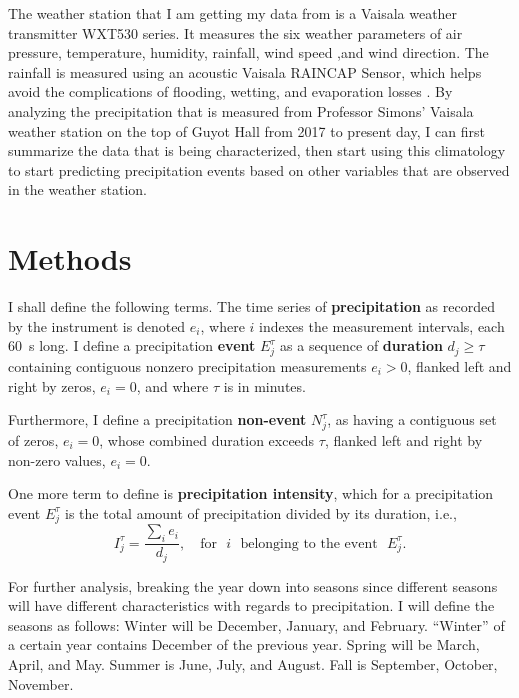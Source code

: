 \documentclass[11pt]{report}
\newcommand{\fracd}[2]{\frac{\displaystyle{#1}}{\displaystyle{#2}}}
\begin{document}
% 

 The weather station that I am getting my data from is a Vaisala weather transmitter WXT530 series. It measures the six weather parameters of air pressure, temperature, humidity, rainfall, wind speed ,and wind direction. The rainfall is measured using an acoustic Vaisala RAINCAP Sensor, which helps avoid the complications of flooding, wetting, and evaporation losses \cite{Vaisala}. By analyzing the precipitation that is measured from Professor Simons' Vaisala weather station on the top of Guyot Hall from 2017 to present day, I can first summarize the data that is being characterized, then start using this climatology to start predicting precipitation events based on other variables that are observed in the weather station. 
\section{Methods \label{sec:methods}}

I shall define the following terms. The time series of
\textbf{precipitation} as recorded by the instrument is denoted $e_i$,
where $i$ indexes the measurement intervals, each 60~s long. I define
a precipitation \textbf{event} $E_j^\tau $ as a sequence of
\textbf{duration} $d_j\ge \tau$ containing contiguous nonzero
precipitation measurements $e_i>0$, flanked left and right by zeros,
$e_i=0$, and where $\tau$ is in minutes.

Furthermore, I define a precipitation \textbf{non-event} $N_j^\tau$,
  as having a contiguous set of zeros, $e_i=0$, whose combined duration
  exceeds $\tau$, flanked left and right by non-zero values, $e_i=0$.

One more term to define is \textbf{precipitation intensity}, which for
a precipitation event $E_j^\tau$ is the total amount of precipitation
divided by its duration, i.e., 
\begin{equation}
I_j^\tau = \fracd{\sum_i e_i }{d_j} ,
\quad
\mbox{for}\,\,\,\, i\,\,\,\, \mbox{belonging to the event}\,\,\,\, E_j^\tau
.
\end{equation}


For further analysis, breaking the year down into seasons since
different seasons will have different characteristics with regards to
precipitation. I will define the seasons as follows: Winter will be
December, January, and February. ``Winter'' of a certain year contains
December of the previous year.  Spring will be March, April, and
May. Summer is June, July, and August. Fall is September, October,
November.
\end{document}

